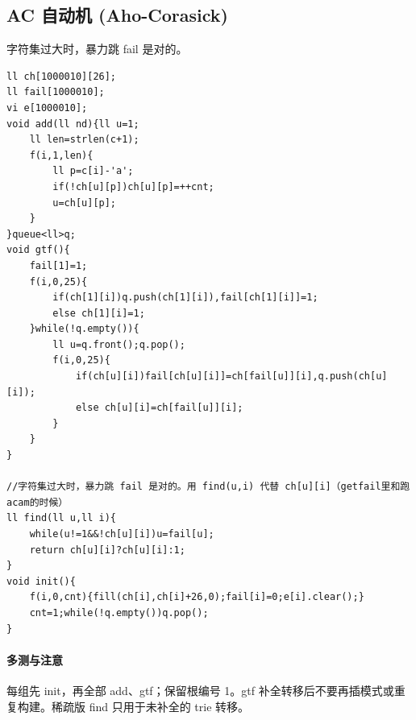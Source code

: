 \subsection{AC 自动机 (Aho-Corasick)}
字符集过大时，暴力跳 fail 是对的。
\begin{lstlisting}
ll ch[1000010][26];
ll fail[1000010];
vi e[1000010];
void add(ll nd){ll u=1;
	ll len=strlen(c+1);
	f(i,1,len){
		ll p=c[i]-'a';
		if(!ch[u][p])ch[u][p]=++cnt;
		u=ch[u][p];
	}
}queue<ll>q;
void gtf(){
	fail[1]=1;
	f(i,0,25){
		if(ch[1][i])q.push(ch[1][i]),fail[ch[1][i]]=1;
		else ch[1][i]=1;
	}while(!q.empty()){
		ll u=q.front();q.pop();
		f(i,0,25){
			if(ch[u][i])fail[ch[u][i]]=ch[fail[u]][i],q.push(ch[u][i]);
			else ch[u][i]=ch[fail[u]][i];
		}
	}
}

//字符集过大时，暴力跳 fail 是对的。用 find(u,i) 代替 ch[u][i]（getfail里和跑acam的时候）
ll find(ll u,ll i){
	while(u!=1&&!ch[u][i])u=fail[u];
    return ch[u][i]?ch[u][i]:1;
}
void init(){
    f(i,0,cnt){fill(ch[i],ch[i]+26,0);fail[i]=0;e[i].clear();}
    cnt=1;while(!q.empty())q.pop();
}
\end{lstlisting}

\paragraph{多测与注意} 每组先 init，再全部 add、gtf；保留根编号 1。gtf 补全转移后不要再插模式或重复构建。稀疏版 find 只用于未补全的 trie 转移。
